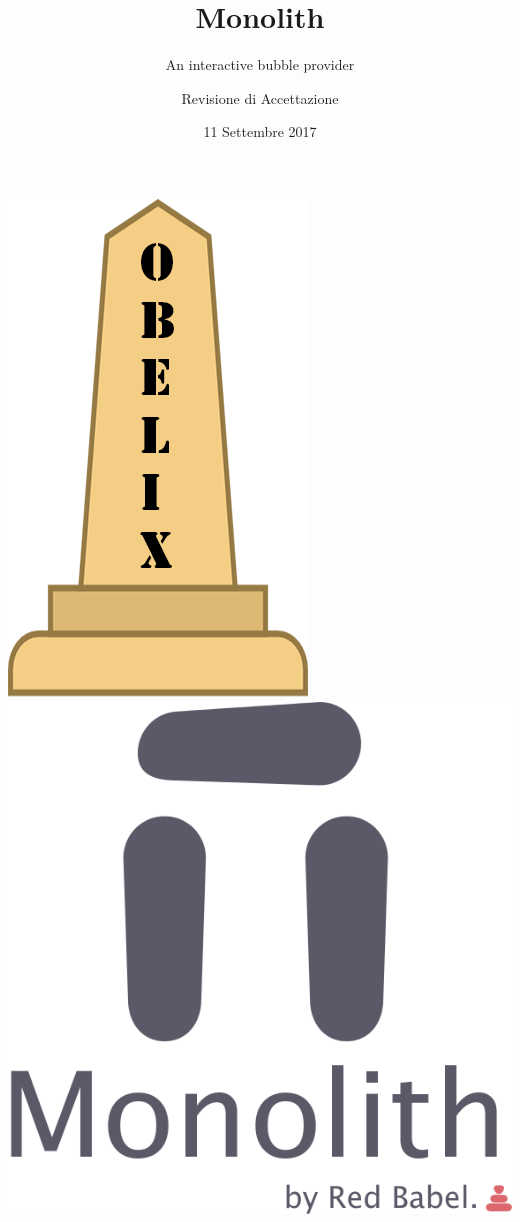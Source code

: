 \documentclass[RawSienna,dvipsnames]{beamer}
\title{Monolith}
\subtitle{An interactive bubble provider}
\author{Revisione di Accettazione}
\date{11 Settembre 2017}
\begin{document}
	
\begin{frame}
	\begin{center}
		\includegraphics[scale=0.13]{img/obelix.png}
		\qquad\qquad
		\includegraphics[scale=0.13]{img/monolith.png}
	\end{center}
	\titlepage
\end{frame}
\end{document}
